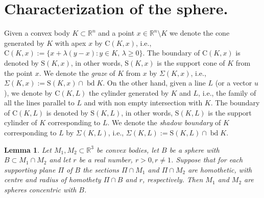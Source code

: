 \documentclass[12pt]{amsart}
\newcommand{\bd}{\operatorname*{bd}}
\newtheorem{lemma}{Lemma}
\begin{document}
\section{Characterization of the sphere.}
Given a convex body $K\subset \mathbb{R}^n$ and a point $x\in\mathbb R^n\setminus K$ we denote the cone generated by $K$ with apex $x$ by $\text{C}(K,x)$, i.e., $\text{C}(K,x):=\{x+\lambda (y-x): y\in K,\, \lambda\geq 0\}.$ The boundary of $\text{C}(K,x)$ is denoted by $\text{S}(K,x)$, in other words, $\text{S}(K,x)$ is the support cone of $K$ from the point $x$. We denote the \emph{graze} of $K$ from $x$ by $\Sigma(K,x)$, i.e., $\Sigma(K,x):=\text{S}(K,x)\cap \bd K.$ On the other hand, given a line $L$ (or a vector $u$), we denote by $\text{C}(K,L)$  the cylinder generated by $K$ and $L$, i.e., the family of all the lines parallel to $L$ and with non empty intersection with $K$. The boundary of $\text{C}(K,L)$ is denoted by $\text{S}(K,L)$, in other words, $\text{S}(K,L)$ is the support cylinder of $K$ corresponding to $L$. We denote the \emph{shadow boundary} of $K$ corresponding to $L$ by $\Sigma(K,L)$, i.e., $\Sigma(K,L):=\text{S}(K,L)\cap \bd K.$  
\begin{lemma}\label{chaparrito} 
Let $M_1, M_2 \subset \mathbb{R}^{3} $ be convex bodies, let $B$ be a sphere with 
$B\subset M_1 \cap M_2 $ and let $r$ be a real number, $r>0, r\not=1$.  Suppose that for each supporting plane 
$\Pi$ of $B$ the sections $\Pi \cap M_1$ and $\Pi \cap M_2$ are homothetic, with centre and radius of homothety $\Pi \cap B$ and $r$, respectively. Then $M_1$ and $M_2$ are spheres  concentric with 
$B$.
\end{lemma}
\end{document}
